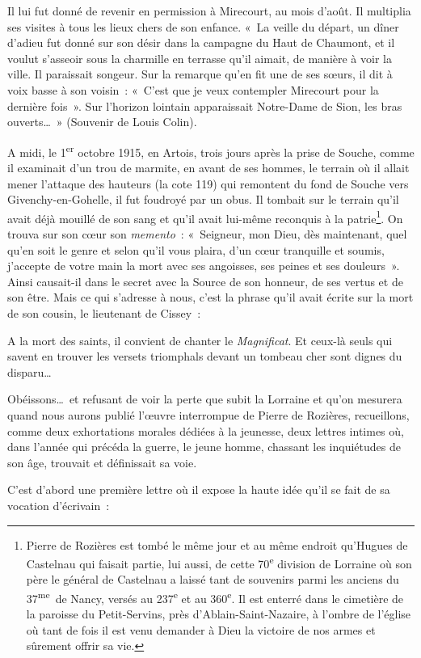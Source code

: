 \documentclass[french,twoside]{book} %
\newenvironment{quoteblock}%
  {\begin{quoting}}
  {\end{quoting}}
\newenvironment{quotebar}{%
    \def\FrameCommand{{\color{rubric!10!}\vrule width 0.5em} \hspace{0.9em}}%
    \def\OuterFrameSep{\itemsep} %
    \MakeFramed {\advance\hsize-\width \FrameRestore}
  }%
  {%
    \endMakeFramed
  }
\renewenvironment{quoteblock}%
  {%
    \savenotes
    \setstretch{0.9}
    \normalfont
    \begin{quotebar}
  }
  {%
    \end{quotebar}
    \spewnotes
  }
\begin{document}
\noindent Il lui fut donné de revenir en permission à Mirecourt, au mois d’août. Il multiplia ses visites à tous les lieux chers de son enfance. « La veille du départ, un dîner d’adieu fut donné sur son désir dans la campagne du Haut de Chaumont, et il voulut s’asseoir sous la charmille en terrasse qu’il aimait, de manière à voir la ville. Il paraissait songeur. Sur la remarque qu’en fit une de ses sœurs, il dit à voix basse à son voisin : « C’est que je veux contempler Mirecourt pour la dernière fois ». Sur l’horizon lointain apparaissait Notre-Dame de Sion, les bras ouverts… » (Souvenir de Louis Colin).‌\par
A midi, le 1\textsuperscript{er} octobre 1915, en Artois, trois jours après la prise de Souche, comme il examinait d’un trou de marmite, en avant de ses hommes, le terrain où il allait mener l’attaque des hauteurs (la cote 119) qui remontent du fond de Souche vers Givenchy-en-Gohelle, il fut foudroyé par un obus. Il tombait sur le terrain qu’il avait déjà mouillé de son sang et qu’il avait lui-même reconquis à la patrie\footnote{\noindent Pierre de Rozières est tombé le même jour et au même endroit qu’Hugues de Castelnau qui faisait partie, lui aussi, de cette 70\textsuperscript{e} division de Lorraine où son père le général de Castelnau a laissé tant de souvenirs parmi les anciens du 37\textsuperscript{me} de Nancy, versés au 237\textsuperscript{e} et au 360\textsuperscript{e}. Il est enterré dans le cimetière de la paroisse du Petit-Servins, près d’Ablain-Saint-Nazaire, à l’ombre de l’église où tant de fois il est venu demander à Dieu la victoire de nos armes et sûrement offrir sa vie.
 }. On trouva sur son cœur son {\itshape memento} : « Seigneur, mon Dieu, dès maintenant, quel qu’en soit le genre et selon qu’il vous plaira, d’un cœur tranquille et soumis, j’accepte de votre main la mort avec ses angoisses, ses peines et ses douleurs ». Ainsi causait-il dans le secret avec la Source de son honneur, de ses vertus et de son être. Mais ce qui s’adresse à nous, c’est la phrase qu’il avait écrite sur la mort de son cousin, le lieutenant de Cissey :‌\par

\begin{quoteblock}
 \noindent A la mort des saints, il convient de chanter le {\itshape Magnificat}. Et ceux-là seuls qui savent en trouver les versets triomphals devant un tombeau cher sont dignes du disparu…‌
 \end{quoteblock}

\noindent Obéissons… et refusant de voir la perte que subit la Lorraine et qu’on mesurera quand nous aurons publié l’œuvre interrompue de Pierre de Rozières, recueillons, comme deux exhortations morales dédiées à la jeunesse, deux lettres intimes où, dans l’année qui précéda la guerre, le jeune homme, chassant les inquiétudes de son âge, trouvait et définissait sa voie.‌\par
C’est d’abord une première lettre où il expose la haute idée qu’il se fait de sa vocation d’écrivain :‌\par
\end{document}
